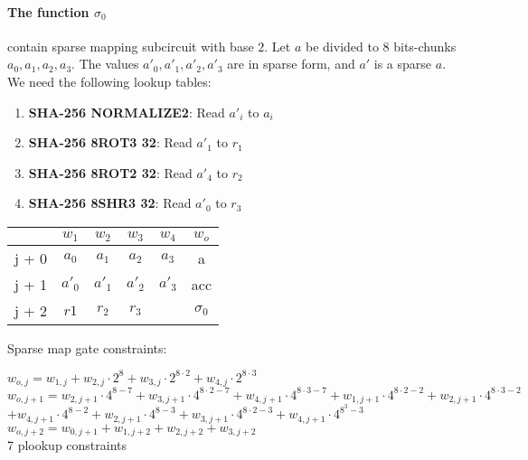 \paragraph{The function $\sigma_0$} contain sparse mapping subcircuit with base $2$.
Let $a$ be divided to 8 bits-chunks $a_0, a_1, a_2, a_3$.
The values $a'_0, a'_1, a'_2, a'_3$ are in sparse form, and $a'$ is a sparse $a$.
We need the following lookup tables:
\begin{enumerate}
\item \textbf{SHA-256 NORMALIZE2}: Read $a'_i$ to $a_i$
\item \textbf{SHA-256 8ROT3 32}: Read $a'_1$ to $r_1$
\item \textbf{SHA-256 8ROT2 32}: Read $a'_4$ to $r_2$
\item \textbf{SHA-256 8SHR3 32}: Read $a'_0$ to $r_3$
\end{enumerate}
\begin{center}
\begin{tabular}{ c|c|c|c|c|c } 
  & $w_1$ & $w_2$ & $w_3$ & $w_4$ & $w_o$\\ 
 \hline
j + 0 & $a_0$ & $ a_1$ & $a_2$ & $a_3$ & a\\ 
j + 1 & $a'_0$ & $a'_1$ & $a'_2$ & $a'_3$ & acc \\
j + 2 & $r1 $& $r_2$ & $r_3$ &  & $\sigma_0$ \\ 
\end{tabular}
\end{center}
Sparse map gate constraints:
\begin{center}
$w_{o,j} = w_{1,j} + w_{2,j} \cdot 2^8 + w_{3,j} \cdot 2^{8 \cdot 2} + w_{4,j} \cdot 2^{8 \cdot 3}$ \\
$w_{o,j + 1} =  w_{2,j + 1} \cdot 4^{8 - 7} + w_{3,j + 1} \cdot 4^{8 \cdot 2 - 7} + w_{4,j + 1} \cdot 4^{8 \cdot 3 - 7}
	 	+ w_{1,j + 1} \cdot 4^{8 \cdot 2 - 2} + w_{2,j + 1} \cdot 4^{8 \cdot 3 - 2}$ \\
	 $+ w_{4,j + 1} \cdot 4^{8 - 2} + w_{2,j + 1} \cdot 4^{8 - 3} + w_{3,j + 1} \cdot 4^{8 \cdot 2 - 3}
	 	+ w_{4,j + 1} \cdot 4^{8^3 - 3}$ \\
$w_{o, j+2} = w_{0, j+1} + w_{1,j+2} + w_{2, j+2} + w_{3, j+2}$ \\
7 plookup constraints \\
\end{center}

